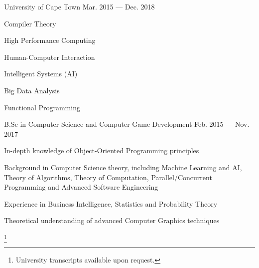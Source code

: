 
\begin{cventries}
  {University of Cape Town}
  {Mar. 2015 --- Dec. 2018}
  {}
  {
    \begin{cvitems}
      \item {Compiler Theory}
      \item {High Performance Computing}
      \item {Human-Computer Interaction}
      \item {Intelligent Systems (AI)}
      \item {Big Data Analysis}
      \item {Functional Programming}
    \end{cvitems}
  }

  {B.Sc in Computer Science and Computer Game Development}
  {Feb. 2015 --- Nov. 2017}
  {}
  {
    \begin{cvitems}
      \item {In-depth knowledge of Object-Oriented Programming principles}
      \item {Background in Computer Science theory, including Machine Learning and AI, Theory of Algorithms, Theory of Computation, Parallel/Concurrent Programming and Advanced Software Engineering}
      \item {Experience in Business Intelligence, Statistics and Probability Theory}
      \item {Theoretical understanding of advanced Computer Graphics techniques}
    \end{cvitems}
  }
\footnote{University transcripts available upon request.}

\end{cventries}
